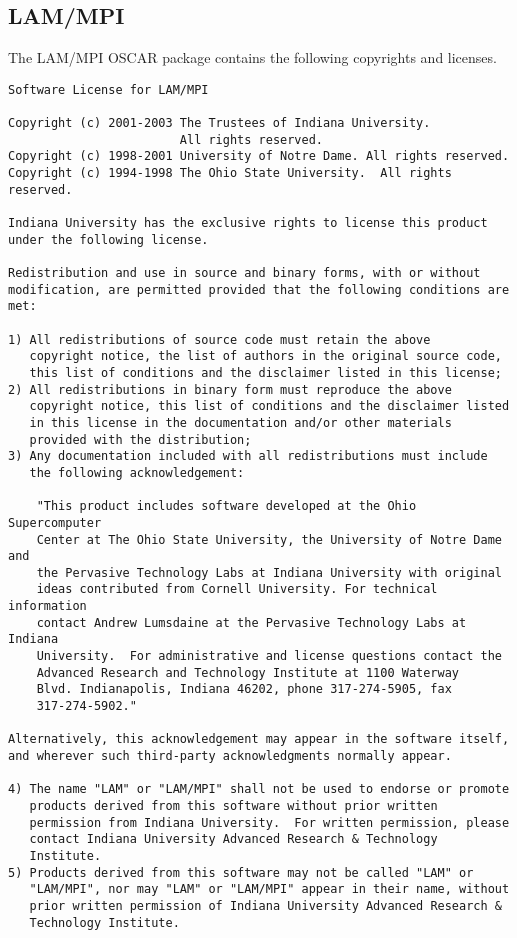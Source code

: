 %
%
%

\subsection{LAM/MPI}
The LAM/MPI OSCAR package contains the following copyrights and
licenses.

\begin{verbatim}
Software License for LAM/MPI

Copyright (c) 2001-2003 The Trustees of Indiana University.  
                        All rights reserved.
Copyright (c) 1998-2001 University of Notre Dame. All rights reserved.
Copyright (c) 1994-1998 The Ohio State University.  All rights reserved.

Indiana University has the exclusive rights to license this product
under the following license.

Redistribution and use in source and binary forms, with or without
modification, are permitted provided that the following conditions are
met:

1) All redistributions of source code must retain the above
   copyright notice, the list of authors in the original source code,
   this list of conditions and the disclaimer listed in this license; 
2) All redistributions in binary form must reproduce the above
   copyright notice, this list of conditions and the disclaimer listed
   in this license in the documentation and/or other materials
   provided with the distribution; 
3) Any documentation included with all redistributions must include
   the following acknowledgement:

    "This product includes software developed at the Ohio Supercomputer
    Center at The Ohio State University, the University of Notre Dame and
    the Pervasive Technology Labs at Indiana University with original
    ideas contributed from Cornell University. For technical information
    contact Andrew Lumsdaine at the Pervasive Technology Labs at Indiana
    University.  For administrative and license questions contact the
    Advanced Research and Technology Institute at 1100 Waterway
    Blvd. Indianapolis, Indiana 46202, phone 317-274-5905, fax
    317-274-5902."

Alternatively, this acknowledgement may appear in the software itself,
and wherever such third-party acknowledgments normally appear.

4) The name "LAM" or "LAM/MPI" shall not be used to endorse or promote
   products derived from this software without prior written
   permission from Indiana University.  For written permission, please
   contact Indiana University Advanced Research & Technology
   Institute.  
5) Products derived from this software may not be called "LAM" or
   "LAM/MPI", nor may "LAM" or "LAM/MPI" appear in their name, without
   prior written permission of Indiana University Advanced Research &
   Technology Institute. 


\end{verbatim}
